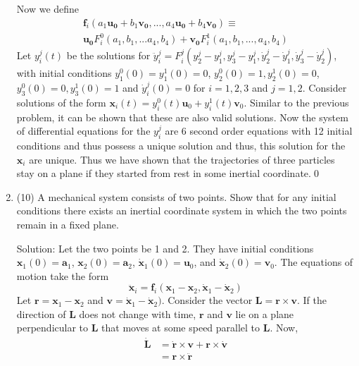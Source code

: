 \begin{enumerate}
Now we define \begin{multline}\label{key}
	\mathbf{f}_i(a_1\mathbf{u_0}+b_1\mathbf{v_0}, ...,a_4\mathbf{u_0}+b_4\mathbf{v_0})\equiv\\ \mathbf{u_0}F_i^0(a_1, b_1,...a_4,b_4)+\mathbf{v_0}F_i^1(a_1,b_1,...,a_4,b_4)
\end{multline}
Let $y_i^j(t)$ be the solutions for $\ddot{y}_i^j = F_i^j(y_2^j-y_1^j, y_3^j-y_1^j ,\dot{y}_2^j -\dot{y}_1^j, \dot{y}_3^j-\dot{y}_2^j)$, with initial conditions $y_1^0(0) = y_1^1(0) = 0$, $y_2^0(0) = 1, y_2^1(0) = 0$, $y_3^0(0) = 0, y_3^1(0) = 1$ and $\dot{y}_i^j(0) = 0$ for $i = 1,2,3$ and $j = 1,2$.  Consider solutions of the form $ 	\mathbf{x}_i(t) = y_i^0(t) \mathbf{u}_0 + y_i^1(t) \mathbf{v}_0 $. Similar to the previous problem, it can be shown that these are also valid solutions. Now the system of differential equations for the $y_i^j$ are 6 second order equations with 12 initial conditions and thus possess a unique solution and thus, this solution for the $\mathbf{x}_i$ are unique. Thus we have shown that the trajectories of three particles stay on a plane if they started from rest in some inertial coordinate.\qed
\item (10) A mechanical system consists of two points. Show that for any
initial conditions there exists an inertial coordinate system in which the
two points remain in a fixed plane.\par
Solution: Let the two points be 1 and 2. They have initial conditions $\mathbf{x}_1(0) = \mathbf{a}_1$, $\mathbf{x}_2(0) = \mathbf{a}_2$, $\dot{\mathbf{x}}_1(0) = \mathbf{u}_0$, and $\dot{\mathbf{x}}_2(0) = \mathbf{v}_0$. The equations of motion take the form\begin{equation}\label{key}
	\ddot{\mathbf{x}}_i = \mathbf{f}_i(\mathbf{x}_1-\mathbf{x}_2, \dot{\mathbf{x}}_1-\dot{\mathbf{x}}_2)
\end{equation}
Let $\mathbf{r}= \mathbf{x}_1-\mathbf{x}_2$ and $\mathbf{v} = \dot{\mathbf{x}}_1-\dot{\mathbf{x}}_2)$. Consider the vector $\mathbf{L} = \mathbf{r}\times\mathbf{v}$. If the direction of $\mathbf{L}$ does not change with time, $\mathbf{r}$ and $\mathbf{v}$ lie on a plane perpendicular to $\mathbf{L}$ that moves at some speed parallel to $\mathbf{L}$. Now,\begin{align}\label{key}
	\dot{\mathbf{L}}& = \dot{\mathbf{r}}\times\mathbf{v}+\mathbf{r}\times\dot{\mathbf{v}}\\
&=	\mathbf{r}\times\ddot{\mathbf{r}}
\end{align}

\end{enumerate}
